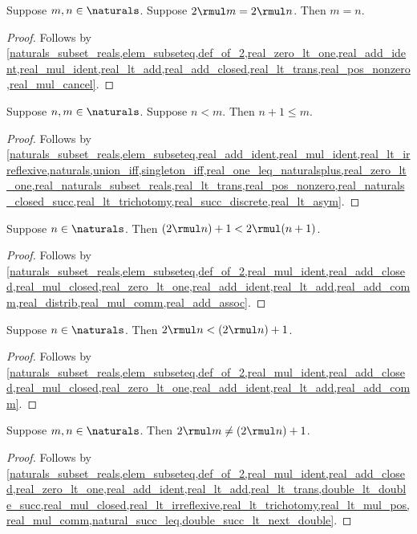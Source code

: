 \begin{lemma}\label{double_injective}
    Suppose $m,n\in\naturals$.
    Suppose $2\rmul m=2\rmul n$.
    Then $m=n$.
\end{lemma}
\begin{proof}
    Follows by \cref{naturals_subset_reals,elem_subseteq,def_of_2,real_zero_lt_one,real_add_ident,real_mul_ident,real_lt_add,real_add_closed,real_lt_trans,real_pos_nonzero,real_mul_cancel}.
\end{proof}

\begin{lemma}\label{natural_succ_leq}
    Suppose $n,m\in\naturals$.
    Suppose $n < m$.
    Then $n+1\leq m$.
\end{lemma}
\begin{proof}
    Follows by \cref{naturals_subset_reals,elem_subseteq,real_add_ident,real_mul_ident,real_lt_irreflexive,naturals,union_iff,singleton_iff,real_one_leq_naturalsplus,real_zero_lt_one,real_naturals_subset_reals,real_lt_trans,real_pos_nonzero,real_naturals_closed_succ,real_lt_trichotomy,real_succ_discrete,real_lt_asym}.
\end{proof}

\begin{lemma}\label{double_succ_lt_next_double}
    Suppose $n\in\naturals$.
    Then $(2\rmul n)+1 < 2\rmul(n+1)$.
\end{lemma}
\begin{proof}
    Follows by \cref{naturals_subset_reals,elem_subseteq,def_of_2,real_mul_ident,real_add_closed,real_mul_closed,real_zero_lt_one,real_add_ident,real_lt_add,real_add_comm,real_distrib,real_mul_comm,real_add_assoc}.
\end{proof}

\begin{lemma}\label{double_lt_double_succ}
    Suppose $n\in\naturals$.
    Then $2\rmul n < (2\rmul n)+1$.
\end{lemma}
\begin{proof}
    Follows by \cref{naturals_subset_reals,elem_subseteq,def_of_2,real_mul_ident,real_add_closed,real_mul_closed,real_zero_lt_one,real_add_ident,real_lt_add,real_add_comm}.
\end{proof}

\begin{lemma}\label{double_neq_double_succ}
    Suppose $m,n\in\naturals$.
    Then $2\rmul m\neq(2\rmul n)+1$.
\end{lemma}
\begin{proof}
    Follows by \cref{naturals_subset_reals,elem_subseteq,def_of_2,real_mul_ident,real_add_closed,real_zero_lt_one,real_add_ident,real_lt_add,real_lt_trans,double_lt_double_succ,real_mul_closed,real_lt_irreflexive,real_lt_trichotomy,real_lt_mul_pos,real_mul_comm,natural_succ_leq,double_succ_lt_next_double}.
\end{proof}

